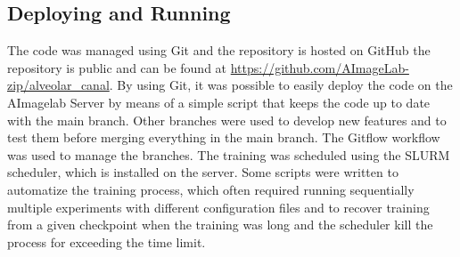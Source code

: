 \subsection{Deploying and Running}
The code was managed using Git and the repository is hosted on GitHub the
repository is public and can be found at \url{https://github.com/AImageLab-zip/alveolar\_canal}.
By using Git, it was possible to easily deploy the code on the AImagelab Server by
means of a simple script that keeps the code up to date with the main branch.
Other branches were used to develop new features and to test them before merging
everything in the main branch. The Gitflow workflow was used to manage the
branches. The training was scheduled using the SLURM scheduler, which is
installed on the server. Some scripts were written to automatize the training
process, which often required running sequentially multiple experiments with
different configuration files and to recover training from a given checkpoint
when the training was long and the scheduler kill the process for exceeding the
time limit.

